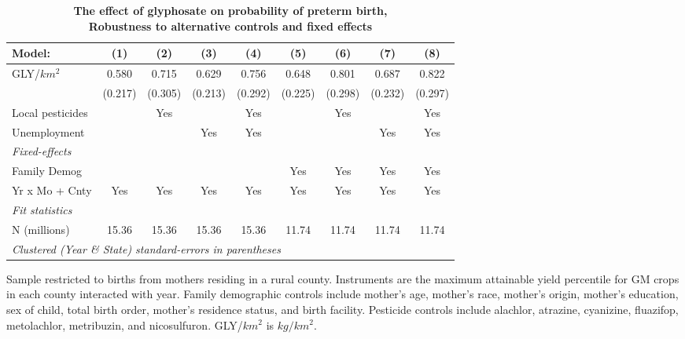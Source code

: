 \begin{table}[htbp]
   \centering
   \small
   \begin{threeparttable}[b]
      \caption{\label{tab:robust-cntrl-i_preterm-allyielddiffpercentilegmomax} \textbf{The effect of glyphosate on probability of preterm birth, \\ Robustness to alternative controls and fixed effects}}
      \begin{tabular}{lcccccccc}
         \toprule
         Model:           & (1)     & (2)     & (3)     & (4)     & (5)     & (6)     & (7)     & (8)\\  
         \midrule 
         GLY/$km^2$       & 0.580   & 0.715   & 0.629   & 0.756   & 0.648   & 0.801   & 0.687   & 0.822\\   
                          & (0.217) & (0.305) & (0.213) & (0.292) & (0.225) & (0.298) & (0.232) & (0.297)\\   
         Local pesticides &         & Yes     &         & Yes     &         & Yes     &         & Yes\\  
         Unemployment     &         &         & Yes     & Yes     &         &         & Yes     & Yes\\  
         \midrule
         \emph{Fixed-effects}\\
         Family Demog     &         &         &         &         & Yes     & Yes     & Yes     & Yes\\  
         Yr x Mo + Cnty   & Yes     & Yes     & Yes     & Yes     & Yes     & Yes     & Yes     & Yes\\  
         \midrule
         \emph{Fit statistics}\\
         N (millions)     & 15.36   & 15.36   & 15.36   & 15.36   & 11.74   & 11.74   & 11.74   & 11.74\\  
         \midrule
         \multicolumn{9}{l}{\emph{Clustered (Year \& State) standard-errors in parentheses}}\\
      \end{tabular}
      
      \begin{tablenotes}\item Sample restricted to births from mothers residing in a rural county. Instruments are the maximum attainable yield percentile for GM crops in each county interacted with year. Family demographic controls include mother's age, mother's race, mother's origin, mother's education, sex of child, total birth order, mother's residence status, and birth facility. Pesticide controls include alachlor, atrazine, cyanizine, fluazifop, metolachlor, metribuzin, and nicosulfuron. GLY/$km^2$ is $kg/km^2$.
      \end{tablenotes}
   \end{threeparttable}
\end{table}

